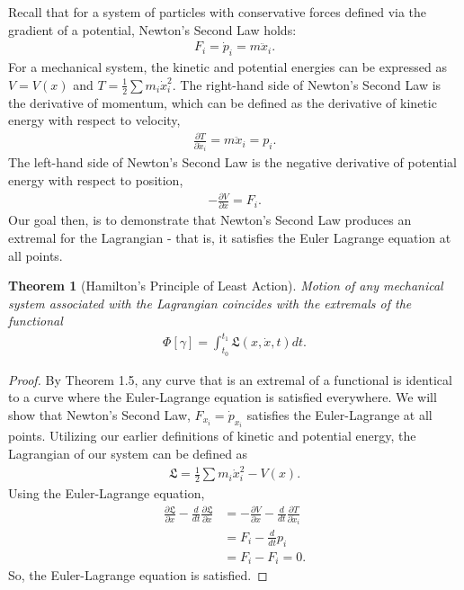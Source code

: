 \documentclass[10pt, psamsfonts]{amsart}
\newtheorem{thm}{Theorem}[section]
\theoremstyle{definition}
\theoremstyle{remark}
\numberwithin{equation}{section}
\begin{document}
Recall that for a system of particles with conservative forces defined via the gradient of a potential, Newton's Second Law holds:
\begin{align*}
  F_i = \dot{p}_i = m \ddot{x}_i. 
\end{align*}
For a mechanical system, the kinetic and potential energies can be expressed as $V = V(x)$ and $T = \frac{1}{2} \sum m_i \dot{x}_i^2$.
The right-hand side of Newton's Second Law is the derivative of momentum, which can be defined as the derivative of kinetic energy with respect to velocity,
\begin{align*}
  \frac{\partial T }{\partial \dot{x}_i} = m\ddot{x}_i = p_i.
\end{align*}
The left-hand side of Newton's Second Law is the negative derivative of potential energy with respect to position,
\begin{align*}
  -\frac{\partial V}{\partial x} = F_i.
 \end{align*}
Our goal then, is to demonstrate that Newton's Second Law produces an extremal for the Lagrangian - that is, it satisfies the Euler Lagrange equation at all points.

\begin{thm}[Hamilton's Principle of Least Action]
Motion of any mechanical system associated with the Lagrangian coincides with the extremals of the functional
\begin{align*}
  \Phi[\gamma] = \int_{t_0}^{t_1} \mathfrak{L}  (x, \dot{x}, t)dt.
\end{align*}
\end{thm}

\begin{proof}
By Theorem 1.5, any curve that is an extremal of a functional is identical to a curve where the Euler-Lagrange equation is satisfied everywhere. We will show that Newton's Second Law, $F_{x_i} = \dot{p}_{x_i}$ satisfies the Euler-Lagrange at all points. Utilizing our earlier definitions of kinetic and potential energy, the Lagrangian of our system can be defined as
\begin{align*}
  \mathfrak{L} = \frac{1}{2} \sum m_i \dot{x}_i^2 - V(x).
\end{align*}
Using the Euler-Lagrange equation,
\begin{align*}
  \frac{\partial \mathfrak{L}}{\partial x} - \frac{d}{dt} \frac{\partial \mathfrak{L}}{\partial \dot{x}} &= -\frac{\partial V}{\partial x} - \frac{d}{dt} \frac{\partial T}{\partial \dot{x}_i}  \\
  &= F_i - \frac{d}{dt}p_i \\
  &= F_i - F_i = 0.
\end{align*}
So, the Euler-Lagrange equation is satisfied.
\end{proof}
\end{document}
